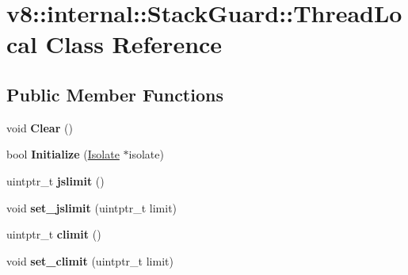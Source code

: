 \hypertarget{classv8_1_1internal_1_1_stack_guard_1_1_thread_local}{}\section{v8\+:\+:internal\+:\+:Stack\+Guard\+:\+:Thread\+Local Class Reference}
\label{classv8_1_1internal_1_1_stack_guard_1_1_thread_local}
\subsection*{Public Member Functions}
\begin{DoxyCompactItemize}
\item 
void {\bfseries Clear} ()\hypertarget{classv8_1_1internal_1_1_stack_guard_1_1_thread_local_ac1c4967b6c909e999acabe4ac50e6f0a}{}\label{classv8_1_1internal_1_1_stack_guard_1_1_thread_local_ac1c4967b6c909e999acabe4ac50e6f0a}

\item 
bool {\bfseries Initialize} (\hyperlink{classv8_1_1internal_1_1_isolate}{Isolate} $\ast$isolate)\hypertarget{classv8_1_1internal_1_1_stack_guard_1_1_thread_local_abb373d7bdbbfb51b1d0d770fbbe96da6}{}\label{classv8_1_1internal_1_1_stack_guard_1_1_thread_local_abb373d7bdbbfb51b1d0d770fbbe96da6}

\item 
uintptr\+\_\+t {\bfseries jslimit} ()\hypertarget{classv8_1_1internal_1_1_stack_guard_1_1_thread_local_a9db27b7ab8f5b6462d9f5aa86b9f8654}{}\label{classv8_1_1internal_1_1_stack_guard_1_1_thread_local_a9db27b7ab8f5b6462d9f5aa86b9f8654}

\item 
void {\bfseries set\+\_\+jslimit} (uintptr\+\_\+t limit)\hypertarget{classv8_1_1internal_1_1_stack_guard_1_1_thread_local_ae0f5e84ce488b12edabedad1d7c99bf5}{}\label{classv8_1_1internal_1_1_stack_guard_1_1_thread_local_ae0f5e84ce488b12edabedad1d7c99bf5}

\item 
uintptr\+\_\+t {\bfseries climit} ()\hypertarget{classv8_1_1internal_1_1_stack_guard_1_1_thread_local_aefda2914744007007621534243e9b288}{}\label{classv8_1_1internal_1_1_stack_guard_1_1_thread_local_aefda2914744007007621534243e9b288}

\item 
void {\bfseries set\+\_\+climit} (uintptr\+\_\+t limit)\hypertarget{classv8_1_1internal_1_1_stack_guard_1_1_thread_local_ad585f61056924397d8baa14d2b9f0735}{}\label{classv8_1_1internal_1_1_stack_guard_1_1_thread_local_ad585f61056924397d8baa14d2b9f0735}

\end{DoxyCompactItemize}
